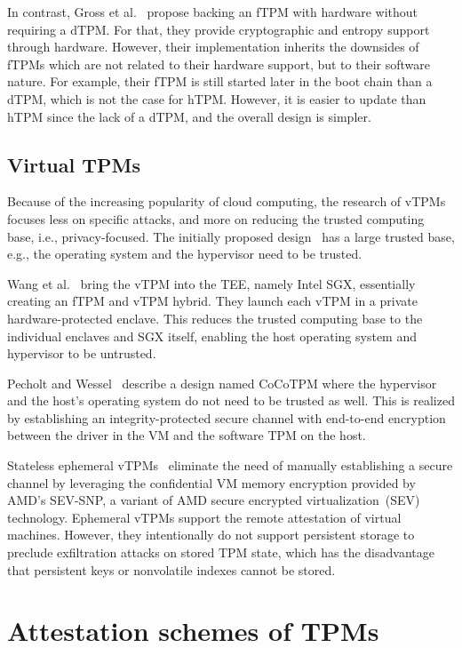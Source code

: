 In contrast, Gross et al.~\cite{Gross2021} propose backing an \ac{fTPM} with hardware without requiring a \ac{dTPM}.
For that, they provide cryptographic and entropy support through hardware.
However, their implementation inherits the downsides of \acp{fTPM} which are not related to their hardware support, but to their software nature.
For example, their \ac{fTPM} is still started later in the boot chain than a \ac{dTPM}, which is not the case for hTPM\@.
However, it is easier to update than hTPM since the lack of a dTPM, and the overall design is simpler.

\subsection{Virtual TPMs}

Because of the increasing popularity of cloud computing, the research of vTPMs focuses less on specific attacks, and more on reducing the trusted computing base, i.e., privacy-focused.
The initially proposed design~\cite{268868} has a large trusted base, e.g., the operating system and the hypervisor need to be trusted.

Wang et al.~\cite{Wang2019} bring the vTPM into the \ac{TEE}, namely Intel SGX, essentially creating an fTPM and vTPM hybrid.
They launch each vTPM in a private hardware-protected enclave.
This reduces the trusted computing base to the individual enclaves and SGX itself, enabling the host operating system and hypervisor to be untrusted.

Pecholt and Wessel~\cite{Pecholt2022} describe a design named CoCoTPM where the hypervisor and the host's operating system do not need to be trusted as well.
This is realized by establishing an integrity-protected secure channel with end-to-end encryption between the driver in the VM and the software TPM on the host.

Stateless ephemeral vTPMs~\cite{Narayanan2023} eliminate the need of manually establishing a secure channel by leveraging the confidential VM memory encryption provided by AMD's SEV-SNP, a variant of AMD secure encrypted virtualization~(SEV) technology.
Ephemeral vTPMs support the remote attestation of virtual machines.
However, they intentionally do not support persistent storage to preclude exfiltration attacks on stored TPM state, which has the disadvantage that persistent keys or nonvolatile indexes cannot be stored.

\section{Attestation schemes of TPMs}

